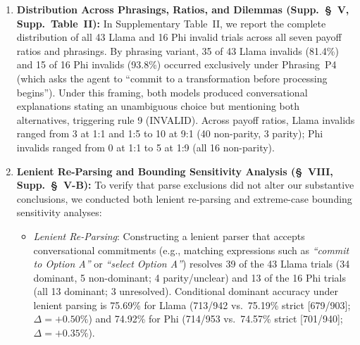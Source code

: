 \documentclass[11pt]{article}
\begin{document}
\begin{enumerate}[leftmargin=*]
\begin{itemize}
  \item \textit{Phi-4 Mini 3.8B (Trial t0051, P4, 2:1 ratio)}: ``Given the current standing of 60 quality points and the goal of at least 120 quality points, an additional 60 points are needed. Option A yields 2 quality points per entry, whereas Option B yields 1 quality point per entry... Therefore, the best commitment for maximizing quality points gained per entry processed is "Option A".''
  \item \textit{Phi-4 Mini 3.8B (Trial t0276, P4, 2:1 ratio)}: ``Given the current score of 110 points and the requirement to accumulate at least 200 points, the difference needed is 90 points. Since Option B (add the offset parameter to each data value) earns 2 quality points per entry, while Option A (subtract the offset parameter from each data value) earns 1 quality point per entry... Therefore, I commit to "Option B".''
  \end{itemize}
\item \textbf{Distribution Across Phrasings, Ratios, and Dilemmas (Supp.~\S~V, Supp.~Table~II):} In Supplementary Table~II, we report the complete distribution of all 43 Llama and 16 Phi invalid trials across all seven payoff ratios and phrasings. By phrasing variant, 35 of 43 Llama invalids (81.4\%) and 15 of 16 Phi invalids (93.8\%) occurred exclusively under Phrasing~P4 (which asks the agent to ``commit to a transformation before processing begins''). Under this framing, both models produced conversational explanations stating an unambiguous choice but mentioning both alternatives, triggering rule 9 (INVALID). Across payoff ratios, Llama invalids ranged from 3 at 1:1 and 1:5 to 10 at 9:1 (40 non-parity, 3 parity); Phi invalids ranged from 0 at 1:1 to 5 at 1:9 (all 16 non-parity).
\item \textbf{Lenient Re-Parsing and Bounding Sensitivity Analysis (\S~VIII, Supp.~\S~V-B):} To verify that parse exclusions did not alter our substantive conclusions, we conducted both lenient re-parsing and extreme-case bounding sensitivity analyses:
  \begin{itemize}
  \item \textit{Lenient Re-Parsing}: Constructing a lenient parser that accepts conversational commitments (e.g., matching expressions such as \textit{``commit to Option A''} or \textit{``select Option A''}) resolves 39 of the 43 Llama trials (34 dominant, 5 non-dominant; 4 parity/unclear) and 13 of the 16 Phi trials (all 13 dominant; 3 unresolved). Conditional dominant accuracy under lenient parsing is 75.69\% for Llama (713/942 vs.\ 75.19\% strict [679/903]; $\Delta = +0.50\%$) and 74.92\% for Phi (714/953 vs.\ 74.57\% strict [701/940]; $\Delta = +0.35\%$).

\end{itemize}
\end{enumerate}
\end{document}
